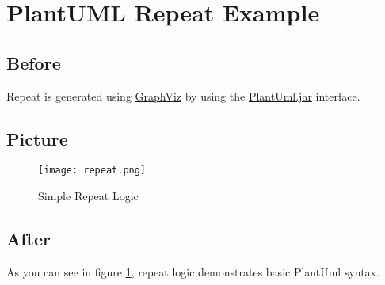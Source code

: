 \documentclass{tlc-article}%
\begin{document}
%
\section{PlantUML Repeat Example}%

  \subsection{Before}%
  Repeat is generated using
  \href{https://graphviz.org}{GraphViz} by using the
  \href{https://plantuml.com}{PlantUml.jar} interface.

  \subsection{Picture}%

  \begin{figure}[h]%
    \centering%
    \texttt{[image: repeat.png]}%
    \caption{Simple Repeat Logic}%
    \label{fig:repeat}%
  \end{figure}%

  \subsection{After}%
  As you can see in figure \ref{fig:repeat}, repeat logic
  demonstrates basic PlantUml syntax.
\end{document}
